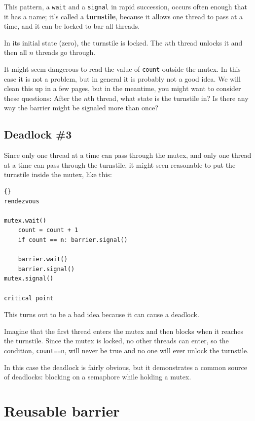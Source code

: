 \documentclass{book}
\newcommand{\clearemptydoublepage}{\newpage\cleardoublepage}
\begin{document}
This pattern, a {\tt wait} and a {\tt signal} in rapid
succession, occurs often enough that it has a name;
it's called a {\bf turnstile}, because it allows one thread to pass
at a time, and it can be locked to bar all threads.

In its initial state (zero), the turnstile is locked.  The $n$th
thread unlocks it and then all $n$ threads go through.

It might seem dangerous to read the value of {\tt count} outside the
mutex.  In this case it is not a problem, but in general it is
probably not a good idea.  We will clean this up in a few pages, but
in the meantime, you might want to consider these questions: After the
$n$th thread, what state is the turnstile in?  Is there any way the
barrier might be signaled more than once?


\clearemptydoublepage
\subsection {Deadlock \#3}

Since only one thread at a time can pass through the
mutex, and only one thread at a time can pass through
the turnstile, it might seen reasonable to put the
turnstile inside the mutex, like this:

\begin{latin}
\begin{latin}
\begin{lstlisting}[title={Bad barrier solution}]{}
rendezvous

mutex.wait()
    count = count + 1
    if count == n: barrier.signal()

    barrier.wait()
    barrier.signal()
mutex.signal()

critical point
\end{lstlisting}
\end{latin}
\end{latin}

This turns out to be a bad idea because it can cause a
deadlock.

Imagine that the first thread enters the
mutex and then blocks when it reaches the turnstile.
Since the mutex is locked, no other threads can enter,
so the condition, {\tt count==n}, will never be true and
no one will ever unlock the turnstile.

In this case the deadlock is fairly obvious, but it
demonstrates a
common source of deadlocks: blocking on a semaphore while
holding a mutex.


\section {Reusable barrier}
\label{rebar}
\end{document}
